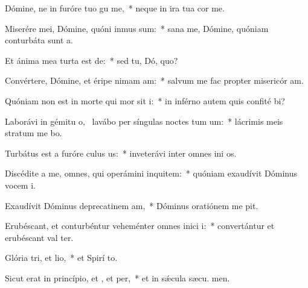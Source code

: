 \item Dómine, ne in furóre tuo gu me,~* neque in ira tua cor me.
\item Miserére mei, Dómine, quóni inmus sum:~* sana me, Dómine, quóniam conturbáta sunt  a.
\item Et ánima mea turta est de:~* sed tu, Dó, quo?
\item Convértere, Dómine, et éripe nimam am:~* salvum me fac propter misericór am.
\item Quóniam non est in morte qui mor sit i:~* in inférno autem quis confité bi?
\item Laborávi in gémitu o,~\pscross{} lavábo per síngulas noctes tum um:~* lácrimis meis stratum me bo.
\item Turbátus est a furóre culus us:~* inveterávi inter omnes ini os.
\item Discédite a me, omnes, qui operámini inquitem:~* quóniam exaudívit Dóminus vocem  i.
\item Exaudívit Dóminus deprecatinem am,~* Dóminus oratiónem me pit.
\item Erubéscant, et conturbéntur veheménter omnes inici i:~* convertántur et erubéscant val ter.
\item Glória tri, et lio,~* et Spirí to.
\item Sicut erat in princípio, et , et per,~* et in sǽcula sæcu. men.
